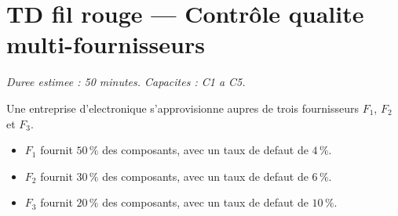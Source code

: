 
\section*{TD fil rouge --- Contrôle qualite multi-fournisseurs}

\textit{Duree estimee : 50 minutes. Capacites : C1 a C5.}

\bigskip

Une entreprise d'electronique s'approvisionne aupres de trois fournisseurs $F_1$, $F_2$ et $F_3$.

\begin{itemize}
  \item $F_1$ fournit $50\,\%$ des composants, avec un taux de defaut de $4\,\%$.
  \item $F_2$ fournit $30\,\%$ des composants, avec un taux de defaut de $6\,\%$.
  \item $F_3$ fournit $20\,\%$ des composants, avec un taux de defaut de $10\,\%$.
\end{itemize}

